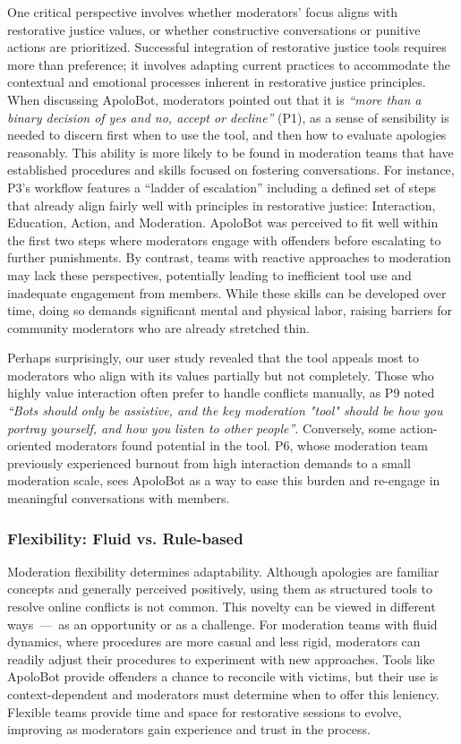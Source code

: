 One critical perspective involves whether moderators' focus aligns with restorative justice values, or whether constructive conversations or punitive actions are prioritized. Successful integration of restorative justice tools requires more than preference; it involves adapting current practices to accommodate the contextual and emotional processes inherent in restorative justice principles. When discussing ApoloBot, moderators pointed out that it is \textit{``more than a binary decision of yes and no, accept or decline''} (P1), as a sense of sensibility is needed to discern first when to use the tool, and then how to evaluate apologies reasonably. This ability is more likely to be found in moderation teams that have established procedures and skills focused on fostering conversations. For instance, P3's workflow features a ``ladder of escalation'' including a defined set of steps that already align fairly well with principles in restorative justice: Interaction, Education, Action, and Moderation. ApoloBot was perceived to fit well within the first two steps where moderators engage with offenders before escalating to further punishments. By contrast, teams with reactive approaches to moderation may lack these perspectives, potentially leading to inefficient tool use and inadequate engagement from members. While these skills can be developed over time, doing so demands significant mental and physical labor, raising barriers for community moderators who are already stretched thin.

Perhaps surprisingly, our user study revealed that the tool appeals most to moderators who align with its values partially but not completely. Those who highly value interaction often prefer to handle conflicts manually, as P9 noted \textit{``Bots should only be assistive, and the key moderation "tool" should be how you portray yourself, and how you listen to other people''}. Conversely, some action-oriented moderators found potential in the tool. P6, whose moderation team previously experienced burnout from high interaction demands to a small moderation scale, sees ApoloBot as a way to ease this burden and re-engage in meaningful conversations with members.

\subsubsection{Flexibility: Fluid vs. Rule-based}

Moderation flexibility determines adaptability. Although apologies are familiar concepts and generally perceived positively, using them as structured tools to resolve online conflicts is not common. This novelty can be viewed in different ways~---~as an opportunity or as a challenge. For moderation teams with fluid dynamics, where procedures are more casual and less rigid, moderators can readily adjust their procedures to experiment with new approaches. Tools like ApoloBot provide offenders a chance to reconcile with victims, but their use is context-dependent and moderators must determine when to offer this leniency. Flexible teams provide time and space for restorative sessions to evolve, improving as moderators gain experience and trust in the process.

